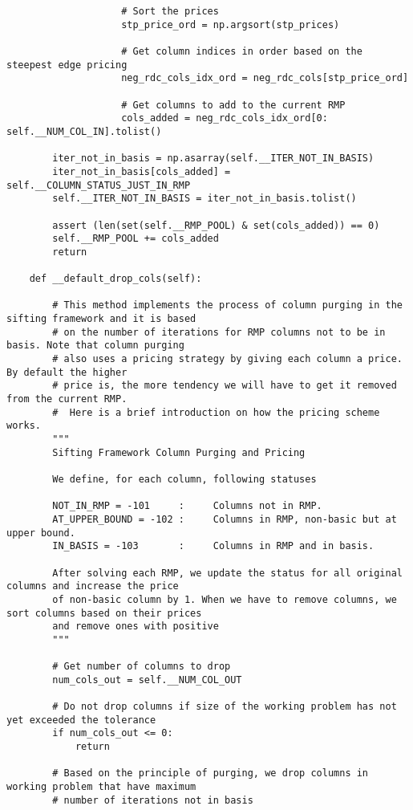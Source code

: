 \documentclass{article}
\begin{document}
\begin{lstlisting}
                    # Sort the prices
                    stp_price_ord = np.argsort(stp_prices)

                    # Get column indices in order based on the steepest edge pricing
                    neg_rdc_cols_idx_ord = neg_rdc_cols[stp_price_ord]

                    # Get columns to add to the current RMP
                    cols_added = neg_rdc_cols_idx_ord[0: self.__NUM_COL_IN].tolist()

        iter_not_in_basis = np.asarray(self.__ITER_NOT_IN_BASIS)
        iter_not_in_basis[cols_added] = self.__COLUMN_STATUS_JUST_IN_RMP
        self.__ITER_NOT_IN_BASIS = iter_not_in_basis.tolist()

        assert (len(set(self.__RMP_POOL) & set(cols_added)) == 0)
        self.__RMP_POOL += cols_added
        return

    def __default_drop_cols(self):

        # This method implements the process of column purging in the sifting framework and it is based
        # on the number of iterations for RMP columns not to be in basis. Note that column purging 
        # also uses a pricing strategy by giving each column a price. By default the higher 
        # price is, the more tendency we will have to get it removed from the current RMP.
        #  Here is a brief introduction on how the pricing scheme works.
        """
        Sifting Framework Column Purging and Pricing

        We define, for each column, following statuses

        NOT_IN_RMP = -101     :     Columns not in RMP.
        AT_UPPER_BOUND = -102 :     Columns in RMP, non-basic but at upper bound.                                    
        IN_BASIS = -103       :     Columns in RMP and in basis.                                     

        After solving each RMP, we update the status for all original columns and increase the price 
        of non-basic column by 1. When we have to remove columns, we sort columns based on their prices 
        and remove ones with positive
        """

        # Get number of columns to drop
        num_cols_out = self.__NUM_COL_OUT

        # Do not drop columns if size of the working problem has not yet exceeded the tolerance
        if num_cols_out <= 0:
            return

        # Based on the principle of purging, we drop columns in working problem that have maximum
        # number of iterations not in basis


\end{lstlisting}
\end{document}
